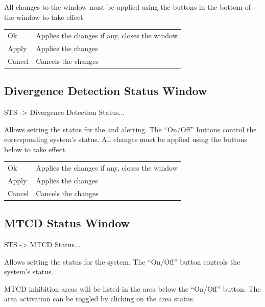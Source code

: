 \documentclass[a4paper,oneside,11pt]{memoir}
\begin{document}
All changes to the window must be applied using the buttons in the bottom of the window to take effect.

\begin{longtable}{p{2.5cm} p{10cm}}
  Ok      & Applies the changes if any, closes the window\\
  Apply   & Applies the changes\\
  Cancel  & Cancels the changes\\
\end{longtable}

\subsection{Divergence Detection Status Window}
\label{win:ddsw}

 STS -> Divergence Detection Status...

\bigskip


Allows setting the status for the  and  alerting. The “On/Off” buttons control the corresponding system’s status. All changes must be applied using the buttons below to take effect.

\begin{longtable}{p{2.5cm} p{10cm}}
    Ok      & Applies the changes if any, closes the window\\
    Apply   & Applies the changes\\
    Cancel  & Cancels the changes\\
\end{longtable}

\subsection{MTCD Status Window}
\label{win:mtcdsw}

 STS -> MTCD Status...

\bigskip


Allows setting the status for the  system. The “On/Off” button controls the system’s status.

\bigskip

MTCD inhibition areas will be listed in the area below the “On/Off” button. The area activation can be toggled by clicking on the area status.
\end{document}
